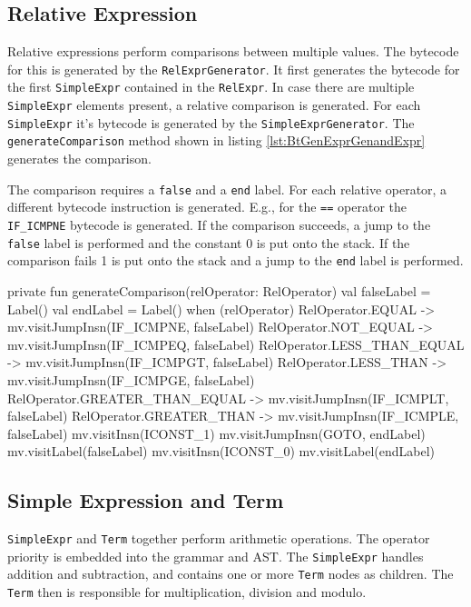 \subsection{Relative Expression}

Relative expressions perform comparisons between multiple values. The bytecode for this is generated by the \verb|RelExprGenerator|. It first generates the bytecode for the first \verb|SimpleExpr| contained in the \verb|RelExpr|. In case there are multiple \verb|SimpleExpr| elements present, a relative comparison is generated. For each \verb|SimpleExpr| it's bytecode is generated by the \verb|SimpleExprGenerator|. The \verb|generateComparison| method shown in listing \ref{lst:BtGenExprGenandExpr} generates the comparison. 

The comparison requires a \verb|false| and a \verb|end| label. For each relative operator, a different bytecode instruction is generated. E.g., for the \verb|==| operator the \verb|IF_ICMPNE| bytecode is generated. If the comparison succeeds, a jump to the \verb|false| label is performed and the constant 0 is put onto the stack. If the comparison fails 1 is put onto the stack and a jump to the \verb|end| label is performed. 

\begin{KotlinCode}[float,numbers=none,caption=Implementation of the \texttt{generateComparison} method of the \texttt{RelExprGenerator}., label=lst:BtGenExprGenandExpr]
private fun generateComparison(relOperator: RelOperator) {
    val falseLabel = Label()
    val endLabel = Label()
    when (relOperator) {
        RelOperator.EQUAL -> mv.visitJumpInsn(IF_ICMPNE, falseLabel)
        RelOperator.NOT_EQUAL -> mv.visitJumpInsn(IF_ICMPEQ, falseLabel)
        RelOperator.LESS_THAN_EQUAL -> mv.visitJumpInsn(IF_ICMPGT, falseLabel)
        RelOperator.LESS_THAN -> mv.visitJumpInsn(IF_ICMPGE, falseLabel)
        RelOperator.GREATER_THAN_EQUAL -> mv.visitJumpInsn(IF_ICMPLT, falseLabel)
        RelOperator.GREATER_THAN -> mv.visitJumpInsn(IF_ICMPLE, falseLabel)
    }
    mv.visitInsn(ICONST_1)
    mv.visitJumpInsn(GOTO, endLabel)
    mv.visitLabel(falseLabel)
    mv.visitInsn(ICONST_0)
    mv.visitLabel(endLabel)
}
\end{KotlinCode}

\subsection{Simple Expression and Term}

\verb|SimpleExpr| and \verb|Term| together perform arithmetic operations. The operator priority is embedded into the grammar and AST. The \verb|SimpleExpr| handles addition and subtraction, and contains one or more \verb|Term| nodes as children. The \verb|Term| then is responsible for multiplication, division and modulo. 

